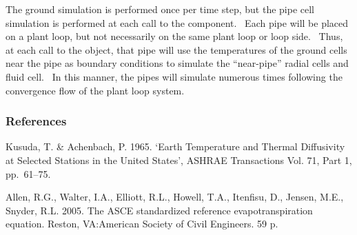 The ground simulation is performed once per time step, but the pipe cell simulation is performed at each call to the component.~ Each pipe will be placed on a plant loop, but not necessarily on the same plant loop or loop side.~ Thus, at each call to the object, that pipe will use the temperatures of the ground cells near the pipe as boundary conditions to simulate the ``near-pipe'' radial cells and fluid cell.~ In this manner, the pipes will simulate numerous times following the convergence flow of the plant loop system.

\subsubsection{References}\label{references-2-006}

Kusuda, T. \& Achenbach, P. 1965. `Earth Temperature and Thermal Diffusivity at Selected Stations in the United States', ASHRAE Transactions Vol. 71, Part 1, pp.~61--75.

Allen, R.G., Walter, I.A., Elliott, R.L., Howell, T.A., Itenfisu, D., Jensen, M.E., Snyder, R.L. 2005. The ASCE standardized reference evapotranspiration equation. Reston, VA:American Society of Civil Engineers. 59 p.
